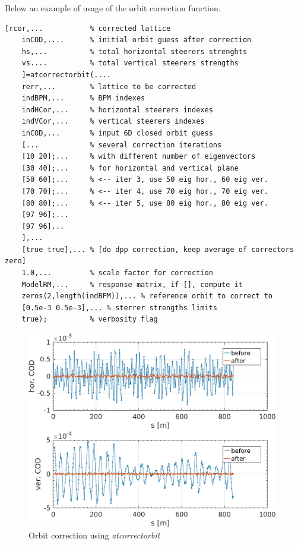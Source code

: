 Below an example of usage of the orbit correction function. 
\begin{lstlisting}
[rcor,...           % corrected lattice
    inCOD,....      % initial orbit guess after correction
    hs,...          % total horizontal steerers strenghts
    vs....          % total vertical steerers strengths
    ]=atcorrectorbit(....
    rerr,...        % lattice to be corrected
    indBPM,...      % BPM indexes
    indHCor,...     % horizontal steerers indexes
    indVCor,...     % vertical steerers indexes
    inCOD,...       % input 6D closed orbit guess
    [...            % several correction iterations 
    [10 20];...     % with different number of eigenvectors 
    [30 40];...     % for horizontal and vertical plane
    [50 60];...     % <-- iter 3, use 50 eig hor., 60 eig ver.
    [70 70];...     % <-- iter 4, use 70 eig hor., 70 eig ver.
    [80 80];...     % <-- iter 5, use 80 eig hor., 80 eig ver.
    [97 96];...
    [97 96]...
    ],...
    [true true],... % [do dpp correction, keep average of correctors zero] 
    1.0,...         % scale factor for correction
    ModelRM,...     % response matrix, if [], compute it 
    zeros(2,length(indBPM)),... % reference orbit to correct to
    [0.5e-3 0.5e-3],... % sterrer strengths limits
    true);          % verbosity flag
\end{lstlisting}


\begin{figure}[!h]
	\centering
	\includegraphics[width=0.98\textwidth]{./images/corrections/OrbitCor.jpg}
	\caption{Orbit correction using \emph{atcorrectorbit}}
	\label{fig:orbitcor}
\end{figure}


